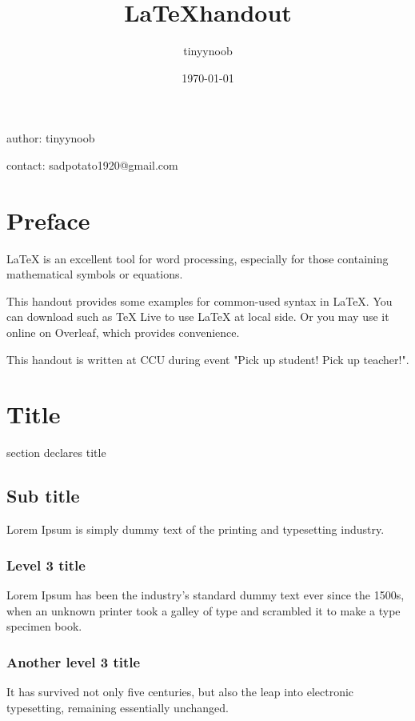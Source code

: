 \documentclass{article}
\title{\huge \LaTeX \space handout}
\author{tinyynoob}
\date{\large \today}
\begin{document}
\begin{titlepage}
    \maketitle
    \vfill
    \hfill author: tinyynoob

    \hfill contact: sadpotato1920@gmail.com
    \thispagestyle{empty}
\end{titlepage}

\section*{Preface}

LaTeX is an excellent tool for word processing, especially for those containing mathematical symbols or equations.

This handout provides some examples for common-used syntax in LaTeX. You can download such as TeX Live to use LaTeX at local side. Or you may use it online on Overleaf, which provides convenience.

This handout is written at CCU during event "Pick up student! Pick up teacher!".
\newpage

\tableofcontents
\newpage

\section{Title}

section declares title

\subsection{Sub title}

Lorem Ipsum is simply dummy text of the printing and typesetting industry.

\subsubsection{Level 3 title}

Lorem Ipsum has been the industry's standard dummy text ever since the 1500s, when an unknown printer took a galley of type and scrambled it to make a type specimen book.

\subsubsection{Another level 3 title}

It has survived not only five centuries, but also the leap into electronic typesetting, remaining essentially unchanged. 
\end{document}
